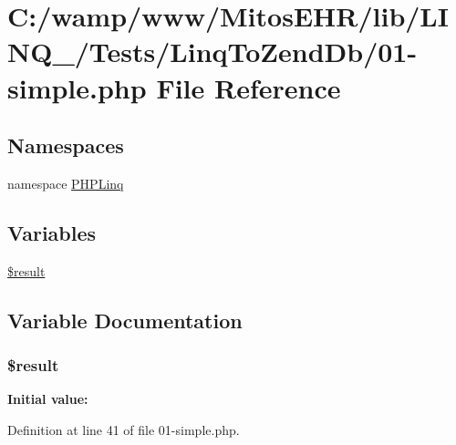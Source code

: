 \hypertarget{_linq_to_zend_db_201-simple_8php}{\section{\-C\-:/wamp/www/\-Mitos\-E\-H\-R/lib/\-L\-I\-N\-Q\-\_/\-Tests/\-Linq\-To\-Zend\-Db/01-\/simple.php \-File \-Reference}
\label{_linq_to_zend_db_201-simple_8php}
}
\subsection*{\-Namespaces}
\begin{DoxyCompactItemize}
\item 
namespace \hyperlink{namespace_p_h_p_linq}{\-P\-H\-P\-Linq}
\end{DoxyCompactItemize}
\subsection*{\-Variables}
\begin{DoxyCompactItemize}
\item 
\hyperlink{_linq_to_zend_db_201-simple_8php_a112ef069ddc0454086e3d1e6d8d55d07}{\$result}
\end{DoxyCompactItemize}


\subsection{\-Variable \-Documentation}
\hypertarget{_linq_to_zend_db_201-simple_8php_a112ef069ddc0454086e3d1e6d8d55d07}{
\subsubsection[{\$result}]{\setlength{\rightskip}{0pt plus 5cm}\$result}}\label{_linq_to_zend_db_201-simple_8php_a112ef069ddc0454086e3d1e6d8d55d07}
{\bfseries \-Initial value\-:}


\-Definition at line 41 of file 01-\/simple.\-php.


